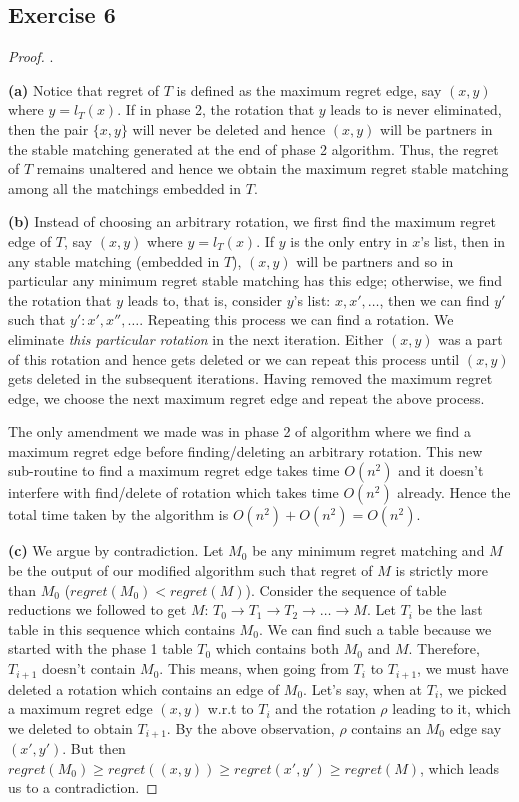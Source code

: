 \documentclass[12pt]{article}
\begin{document}
\subsection*{Exercise 6}
\begin{proof}.

\textbf{(a)} Notice that regret of $T$ is defined as the maximum regret edge, say $(x,y)$ where $y = l_T(x)$. If in phase 2, the rotation that $y$ leads to is never eliminated, then the pair $\{x,y\}$ will never be deleted and hence $(x,y)$ will be partners in the stable matching generated at the end of phase 2 algorithm. Thus, the regret of $T$ remains unaltered and hence we obtain the maximum regret stable matching among all the matchings embedded in $T$.
\newline

\textbf{(b)} Instead of choosing an arbitrary rotation, we first find the maximum regret edge of $T$, say $(x,y)$ where $y=l_T(x)$. If $y$ is the only entry in $x$'s list, then in any stable matching (embedded in $T$), $(x,y)$ will be partners and so in particular any minimum regret stable matching has this edge; otherwise, we find the rotation that $y$ leads to, that is, consider $y$'s list: $x, x', \ldots$, then we can find $y'$ such that $y': x', x'', \ldots$. Repeating this process we can find a rotation. We eliminate \textsl{this particular rotation} in the next iteration. Either $(x,y)$ was a part of this rotation and hence gets deleted or we can repeat this process until $(x,y)$ gets deleted in the subsequent iterations. Having removed the maximum regret edge, we choose the next maximum regret edge and repeat the above process.

The only amendment we made was in phase 2 of algorithm where we find a maximum regret edge before finding/deleting an arbitrary rotation. This new sub-routine to find a maximum regret edge takes time $O(n^2)$ and it doesn't interfere with find/delete of rotation which takes time $O(n^2)$ already. Hence the total time taken by the algorithm is $O(n^2) + O(n^2) = O(n^2)$.
\newline

\textbf{(c)} We argue by contradiction. Let $M_0$ be any minimum regret matching and $M$ be the output of our modified algorithm such that regret of $M$ is strictly more than $M_0$ ($regret(M_0) < regret(M)$). Consider the sequence of table reductions we followed to get $M$: $T_0 \rightarrow T_1 \rightarrow T_2 \rightarrow \ldots \rightarrow M$. Let $T_i$ be the last table in this sequence which contains $M_0$. We can find such a table because we started with the phase 1 table $T_0$ which contains both $M_0$ and $M$. Therefore, $T_{i+1}$ doesn't contain $M_0$. This means, when going from $T_i$ to $T_{i+1}$, we must have deleted a rotation which contains an edge of $M_0$.
Let's say, when at $T_i$, we picked a maximum regret edge $(x,y)$ w.r.t to $T_i$ and the rotation $\rho$ leading to it, which we deleted to obtain $T_{i+1}$. By the above observation, $\rho$ contains an $M_0$ edge say $(x',y')$. But then $regret(M_0) \geq regret((x,y)) \geq regret(x',y') \geq regret(M)$, which leads us to a contradiction.
\end{proof}

\vspace{2in} %
\end{document}
